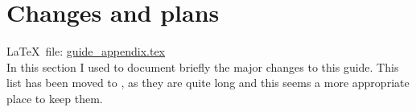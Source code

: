 
\chapter{Changes and plans}%
\label{sec:app:changes}

\LaTeX\ file: \href{run:./guide_appendix.tex}{guide\_appendix.tex}\\[1ex]
\noindent
In this section I used to document briefly the major changes to this guide.
This list has been moved to ,
as they are quite long and this seems a more appropriate place to keep them.























